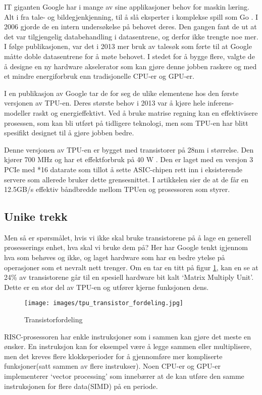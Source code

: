 IT giganten Google har i mange av sine applikasjoner behov for maskin læring. Alt i fra tale- og bildegjenkjenning, til å slå eksperter i komplekse spill som Go \cite{look_at_TPU}. I 2006 gjorde de en intern undersøkelse på behovet deres. Den gangen fant de ut at det var tilgjengelig databehandling i datasentrene, og derfor ikke trengte noe mer. I følge publikasjonen, var det i 2013 mer bruk av talesøk som førte til at Google måtte doble datasentrene for å møte behovet. I stedet for å bygge flere, valgte de å designe en ny hardware akselerator som kan gjøre denne jobben raskere og med et mindre energiforbruk enn tradisjonelle CPU-er og GPU-er.

I en publikasjon av Google \cite{tpu_main} tar de for seg de ulike elementene hos den første versjonen av TPU-en. Deres største behov i 2013 var å kjøre hele inferens-modeller raskt og energieffektivt. Ved å bruke matrise regning kan en effektivisere prosessen, som kan bli utført på tidligere teknologi, men som TPU-en har blitt spesifikt designet til å gjøre jobben bedre.

Denne versjonen av TPU-en er bygget med transistorer på 28nm i størrelse. Den kjører 700 MHz og har et effektforbruk på 40 W \cite{tpu_main}. Den er laget med en versjon 3 PCIe med *16 datarate som tillot å sette ASIC-chipen rett inn i eksisterende servere som allerede bruker dette grensesnittet. I artikkelen sier de at de får en 12.5GB/s effektiv båndbredde mellom TPUen og prosessoren som styrer.
 
\subsection{Unike trekk}
Men så er spørsmålet, hvis vi ikke skal bruke transistorene på å lage en generell prosesserings enhet, hva skal vi bruke dem på? Her har Google tenkt igjennom hva som behøves og ikke, og laget hardware som har en bedre ytelse på operasjoner som et nevralt nett trenger. Om en tar en titt på figur \ref{fig:transistor}, kan en se at 24\% av transistorene går til en spesiell hardware bit kalt ‘Matrix Multiply Unit’. Dette er en stor del av TPU-en og utfører kjerne funksjonen dens.

\begin{figure}[ht]
    \centering
    \texttt{[image: images/tpu\_transistor\_fordeling.jpg]}
    \caption{Transistorfordeling}
    \label{fig:transistor}
\end{figure}
 
RISC-prosessoren har enkle instruksjoner som i sammen kan gjøre det meste en ønsker. En instruksjon kan for eksempel være å legge sammen eller multiplisere, men det kreves flere klokkeperioder for å gjennomføre mer kompliserte funksjoner(satt sammen av flere instrukser). Noen CPU-er og GPU-er implementerer ‘vector processing’ \cite{look_at_TPU} som innebærer at de kan utføre den samme instruksjonen for flere data(SIMD) på en periode. 

